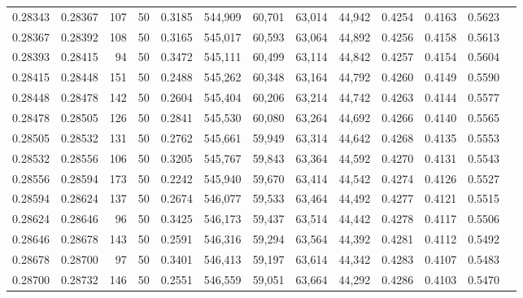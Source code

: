 \begin{tabular}{rrrrrrrrrrrrr}
0.28343 & 0.28367 &   107 &  50 &                                     0.3185 & 544,909 &  60,701 &  63,014 &  44,942 & 0.4254 & 0.4163 & 0.5623 \\
0.28367 & 0.28392 &   108 &  50 &                                     0.3165 & 545,017 &  60,593 &  63,064 &  44,892 & 0.4256 & 0.4158 & 0.5613 \\
0.28393 & 0.28415 &    94 &  50 &                                     0.3472 & 545,111 &  60,499 &  63,114 &  44,842 & 0.4257 & 0.4154 & 0.5604 \\
0.28415 & 0.28448 &   151 &  50 &                                     0.2488 & 545,262 &  60,348 &  63,164 &  44,792 & 0.4260 & 0.4149 & 0.5590 \\
0.28448 & 0.28478 &   142 &  50 &                                     0.2604 & 545,404 &  60,206 &  63,214 &  44,742 & 0.4263 & 0.4144 & 0.5577 \\
0.28478 & 0.28505 &   126 &  50 &                                     0.2841 & 545,530 &  60,080 &  63,264 &  44,692 & 0.4266 & 0.4140 & 0.5565 \\
0.28505 & 0.28532 &   131 &  50 &                                     0.2762 & 545,661 &  59,949 &  63,314 &  44,642 & 0.4268 & 0.4135 & 0.5553 \\
0.28532 & 0.28556 &   106 &  50 &                                     0.3205 & 545,767 &  59,843 &  63,364 &  44,592 & 0.4270 & 0.4131 & 0.5543 \\
0.28556 & 0.28594 &   173 &  50 &                                     0.2242 & 545,940 &  59,670 &  63,414 &  44,542 & 0.4274 & 0.4126 & 0.5527 \\
0.28594 & 0.28624 &   137 &  50 &                                     0.2674 & 546,077 &  59,533 &  63,464 &  44,492 & 0.4277 & 0.4121 & 0.5515 \\
0.28624 & 0.28646 &    96 &  50 &                                     0.3425 & 546,173 &  59,437 &  63,514 &  44,442 & 0.4278 & 0.4117 & 0.5506 \\
0.28646 & 0.28678 &   143 &  50 &                                     0.2591 & 546,316 &  59,294 &  63,564 &  44,392 & 0.4281 & 0.4112 & 0.5492 \\
0.28678 & 0.28700 &    97 &  50 &                                     0.3401 & 546,413 &  59,197 &  63,614 &  44,342 & 0.4283 & 0.4107 & 0.5483 \\
0.28700 & 0.28732 &   146 &  50 &                                     0.2551 & 546,559 &  59,051 &  63,664 &  44,292 & 0.4286 & 0.4103 & 0.5470 \\

\end{tabular}
